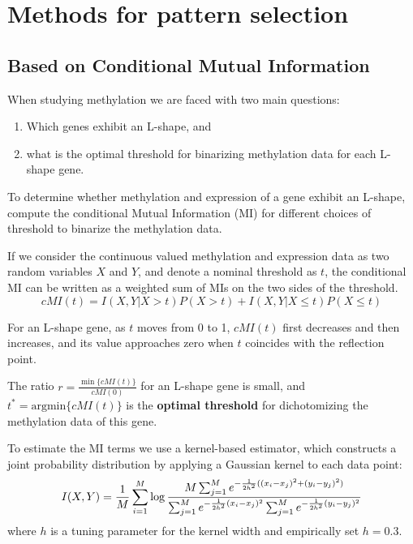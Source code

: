 \section{Methods for pattern selection}

\subsection{Based on Conditional Mutual Information}

When studying methylation we are faced with two main questions:
  \begin{enumerate}
  \item Which genes exhibit an L-shape, and 
  \item what is the optimal threshold for binarizing
methylation data for each L-shape gene.
  \end{enumerate}
To determine whether methylation and expression of a gene exhibit an L-shape,
compute the conditional Mutual Information (MI) for different choices of threshold
to binarize the methylation data.


If we consider the continuous valued methylation and expression data as two random variables
$X$ and $Y$, and denote a nominal threshold as $t$, the conditional MI can be written as a
weighted sum of MIs on the two sides of the threshold.
\[
\mathit{cMI}(t)=I(X,Y|X>t)P(X>t) + I(X,Y|X\le t)P(X\le t)
\]


For an L-shape gene, as $t$ moves from 0 to 1, $\mathit{cMI}(t)$ first decreases and then
increases, and its value approaches zero when $t$ coincides with the reflection point. 
  
The ratio $r=\frac{\min\{\mathit{cMI}(t)\}}{\mathit{cMI}(0)}$ for an L-shape gene is small, 
and $t^{\ast} = \mathrm{argmin}\{ \mathit{cMI}(t) \}$ is the \textbf{optimal threshold} for 
dichotomizing the methylation data of this gene.


To estimate the MI terms we use a kernel-based estimator, which 
constructs a joint probability distribution by applying a Gaussian kernel to each data point:
\[
I(X,Y) = \frac 1M \sum_{i=1}^M \log\frac{M\sum_{j=1}^M e^{-\frac{1}{2h^2}((x_i-x_j)^2+(y_i-y_j)^2)}}{%
                                      \sum_{j=1}^M e^{-\frac{1}{2h^2}(x_i-x_j)^2} \sum_{j=1}^M e^{-\frac{1}{2h^2}(y_i-y_j)^2}}
\]
where $h$ is a tuning parameter for the kernel width and empirically set $h=0.3$.
  


